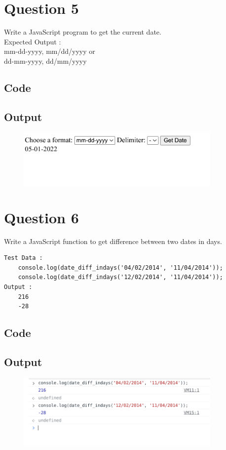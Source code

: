 \documentclass{article}
\begin{document}
\newpage
\section*{Question 5}
Write a JavaScript program to get the current date. \\
Expected Output : \\
mm-dd-yyyy, mm/dd/yyyy or \\
dd-mm-yyyy, dd/mm/yyyy
\subsection*{Code}

\subsection*{Output}
\begin{figure}[H]
    \centering
    \includegraphics[width=10cm]{5/out.png}
\end{figure}

\newpage
\section*{Question 6}
Write a JavaScript function to get difference between two dates in days.
\begin{lstlisting}
Test Data :
    console.log(date_diff_indays('04/02/2014', '11/04/2014'));
    console.log(date_diff_indays('12/02/2014', '11/04/2014'));
Output :
    216
    -28
\end{lstlisting}
\subsection*{Code}

\subsection*{Output}
\begin{figure}[H]
    \centering
    \includegraphics[width=10cm]{6/out.png}
\end{figure}
\end{document}
